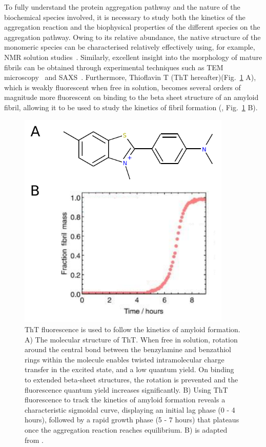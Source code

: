 To fully understand the protein aggregation pathway and the nature of the biochemical species involved, it is necessary to study both the kinetics of the aggregation reaction and the biophysical properties of the different species on the aggregation pathway. Owing to its relative abundance, the native structure of the monomeric species can be characterised relatively effectively using, for example, NMR solution studies~\cite{Dedmon2005}. Similarly, excellent insight into the morphology of mature fibrils can be obtained through experimental techniques such as TEM microscopy~\cite{Gras2011} and SAXS~\cite{Langkilde2009}. Furthermore, Thioflavin T (ThT hereafter)(Fig.~\ref{fig:ThT} A), which is weakly fluorescent when free in solution, becomes several orders of magnitude more fluorescent on binding to the beta sheet structure of an amyloid fibril, allowing it to be used to study the kinetics of fibril formation (\cite{Cohen2012}, Fig.~\ref{fig:ThT} B).

\begin{figure}
   \begin{center}
      \includegraphics*[clip=true, width=4in]{sizing/tht_fig.pdf}
      \caption{ThT fluorescence is used to follow the kinetics of amyloid formation. A) The molecular structure of ThT. When free in solution, rotation around the central bond between the benzylamine and benzathiol rings within the molecule enables twisted intramolecular charge transfer in the excited state, and a low quantum yield. On binding to extended beta-sheet structures, the rotation is prevented and the fluorescence quantum yield increases significantly. B) Using ThT fluorescence to track the kinetics of amyloid formation reveals a characteristic sigmoidal curve, displaying an initial lag phase (0 - 4 hours), followed by a rapid growth phase (5 - 7 hours) that plateaus once the aggregation reaction reaches equilibrium. B) is adapted from \cite{Cohen2012}.}
      \label{fig:ThT}
   \end{center}
\end{figure}

